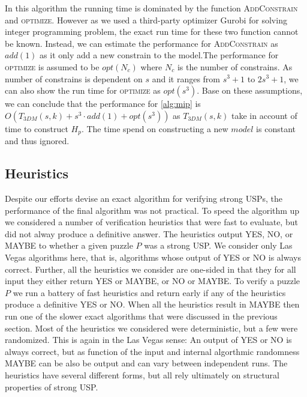 \documentclass[11pt]{article}
\begin{document}
In this algorithm the running time is dominated by the function
\textsc{AddConstrain} and \textsc{optimize}. However as we used a
third-party optimizer Gurobi for solving integer programming problem,
the exact run time for these two function cannot be known. Instead, we
can estimate the performance for \textsc{AddConstrain} as $add(1)$ as
it only add a new constrain to the model.The performance for
\textsc{optimize} is assumed to be $opt(N_c)$ where $N_c$ is the
number of constrains. As number of constrains is dependent on $s$ and
it ranges from $s^3+1$ to $2s^3+1$, we can also show the run time for
\textsc{optimize} as $opt(s^3)$. Base on these assumptions, we can
conclude that the performance for \autoref{alg:mip} is $O(T_{3DM}(s,k)
+ s^3 \cdot add(1) + opt(s^3))$ as $T_{3DM}(s,k)$ take in account of
time to construct $H_p$. The time spend on constructing a new $model$
is constant and thus ignored.

\label{subsec:mip}




\subsection{Heuristics}
\label{sec:heuristic}

Despite our efforts devise an exact algorithm for verifying strong
USPs, the performance of the final algorithm was not practical.  To
speed the algorithm up we considered a number of verification
heuristics that were fast to evaluate, but did not alway produce a
definitive answer.  The heuristics output YES, NO, or MAYBE to whether
a given puzzle $P$ was a strong USP.  We consider only Las Vegas
algorithms here, that is, algorithms whose output of YES or NO is
always correct.  Further, all the heuristics we consider are one-sided
in that they for all input they either return YES or MAYBE, or NO or
MAYBE.  To verify a puzzle $P$ we run a battery of fast heuristics and
return early if any of the heuristics produce a definitive YES or NO.
When all the heuristics result in MAYBE then run one of the slower
exact algorithms that were discussed in the previous section.  Most of
the heuristics we considered were deterministic, but a few were
randomized.  This is again in the Las Vegas sense: An output of YES or
NO is always correct, but as function of the input and internal
algorthmic randomness MAYBE can be also be output and can vary between
independent runs.  The heuristics have several different forms, but
all rely ultimately on structural properties of strong USP.
\end{document}
